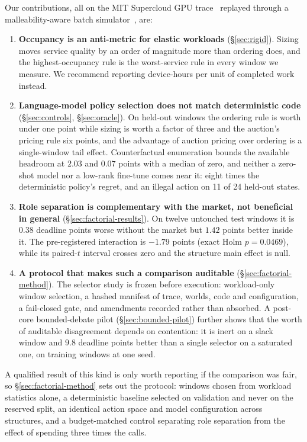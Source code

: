 \documentclass[conference]{IEEEtran}
\begin{document}
Our contributions, all on the MIT Supercloud GPU trace~\cite{supercloud} replayed through a malleability-aware
batch simulator~\cite{elastisim}, are:
\begin{enumerate}
\item \textbf{Occupancy is an anti-metric for elastic workloads} (\S\ref{sec:rigid}). Sizing moves
service quality by an order of magnitude more than ordering does, and the highest-occupancy rule is the
worst-service rule in every window we measure. We recommend reporting device-hours per unit of completed
work instead.
\item \textbf{Language-model policy selection does not match deterministic code} (\S\ref{sec:controls},
\S\ref{sec:oracle}). On held-out windows the ordering rule is worth under one point while
sizing is worth a factor of three and the auction's pricing rule six points, and the advantage of
auction pricing over ordering is a single-window tail effect.
Counterfactual enumeration bounds the available headroom at $2.03$ and $0.07$ points with a median of
zero, and neither a zero-shot model nor a low-rank fine-tune comes near it: eight times the
deterministic policy's regret, and an illegal action on 11 of 24 held-out states.
\item \textbf{Role separation is complementary with the market, not beneficial in general}
(\S\ref{sec:factorial-results}).  On twelve untouched test windows it is $0.38$ deadline points worse
without the market but $1.42$ points better inside it.  The pre-registered interaction is $-1.79$
points (exact Holm $p=0.0469$), while its paired-$t$ interval crosses zero and the structure main
effect is null.
\item \textbf{A protocol that makes such a comparison auditable} (\S\ref{sec:factorial-method}). The
selector study is frozen before execution: workload-only window selection, a hashed manifest of
trace, worlds, code and configuration, a fail-closed gate, and amendments recorded rather than
absorbed.  A post-core bounded-debate pilot (\S\ref{sec:bounded-pilot}) further shows that the worth
of auditable disagreement depends on contention: it is inert on a slack window and $9.8$ deadline
points better than a single selector on a saturated one, on training windows at one seed.
\end{enumerate}

A qualified result of this kind is only worth reporting if the comparison was fair, so
\S\ref{sec:factorial-method} sets out the protocol: windows chosen from workload statistics alone, a
deterministic baseline selected on validation and never on the reserved split, an identical action space
and model configuration across structures, and a budget-matched control separating role separation from
the effect of spending three times the calls.
\end{document}
